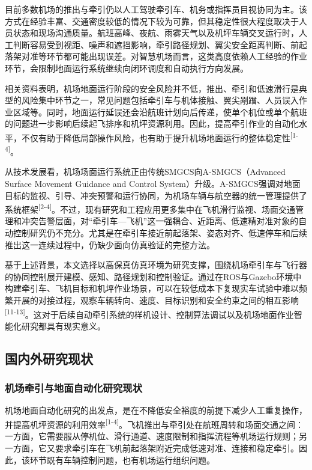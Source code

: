 \documentclass[UTF8,a4paper,12pt]{ctexart}
\begin{document}
目前多数机场的推出与牵引仍以人工驾驶牵引车、机务或指挥员目视协同为主。该方式在经验丰富、交通密度较低的情况下较为可靠，但其稳定性很大程度取决于人员状态和现场沟通质量。航班高峰、夜航、雨雾天气以及机坪车辆交叉运行时，人工判断容易受到视距、噪声和遮挡影响，牵引路径规划、翼尖安全距离判断、前起落架对准等环节都可能出现误差。对智慧机场而言，这类高度依赖人工经验的作业环节，会限制地面运行系统继续向闭环调度和自动执行方向发展。

相关资料表明，机场地面运行阶段的安全风险并不低，推出、牵引和低速滑行是典型的风险集中环节之一，常见问题包括牵引车与机体接触、翼尖剐蹭、人员误入作业区域等。同时，地面运行延误还会沿航班计划向后传递，使单个机位或单个航班的问题进一步影响后续起飞排序和机坪资源利用。因此，提高牵引作业的自动化水平，不仅有助于降低局部操作风险，也有助于提升机场地面运行的整体稳定性\textsuperscript{[1-4]}。

从技术发展看，机场场面运行系统正由传统SMGCS向A-SMGCS（Advanced Surface Movement Guidance and Control System）升级。A-SMGCS强调对地面目标的监视、引导、冲突预警和运行协同，为机场车辆与航空器的统一管理提供了系统框架\textsuperscript{[2-4]}。不过，现有研究和工程应用更多集中在飞机滑行监视、场面交通管理和冲突告警层面，对``牵引车---飞机''这一强耦合、近距离、低速精对准对象的自动控制研究仍不充分。尤其是在牵引车接近前起落架、姿态对齐、低速停车和后续推出这一连续过程中，仍缺少面向仿真验证的完整方法。

基于上述背景，本文选择以高保真仿真环境为研究支撑，围绕机场牵引车与飞行器的协同控制展开建模、感知、路径规划和控制验证。通过在ROS与Gazebo环境中构建牵引车、飞机目标和机坪作业场景，可以在较低成本下复现实车试验中难以频繁开展的对接过程，观察车辆转向、速度、目标识别和安全约束之间的相互影响\textsuperscript{[11-13]}。这对于后续自动牵引系统的样机设计、控制算法调试以及机场地面作业智能化研究都具有现实意义。

\subsection{国内外研究现状}\label{_Toc229105290}

\subsubsection{机场牵引与地面自动化研究现状}\label{_Toc229105291}

机场地面自动化研究的出发点，是在不降低安全裕度的前提下减少人工重复操作，并提高机坪资源的利用效率\textsuperscript{[1-4]}。飞机推出与牵引处在航班周转和场面交通之间：一方面，它需要服从停机位、滑行通道、速度限制和指挥流程等机场运行规则；另一方面，它又要求牵引车在飞机前起落架附近完成低速对准、连接和稳定牵引。因此，该环节既有车辆控制问题，也有机场运行组织问题。
\end{document}
